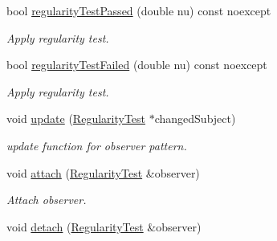 \begin{DoxyCompactItemize}
\item 
bool \hyperlink{classSpacy_1_1Mixin_1_1RegularityTest_a606383e629ebc0e84dc1cb6796aeeae1}{regularity\+Test\+Passed} (double nu) const noexcept
\begin{DoxyCompactList}\small\item\em Apply regularity test. \end{DoxyCompactList}\item 
bool \hyperlink{classSpacy_1_1Mixin_1_1RegularityTest_ac16e5fb18f3b591da58e32b821345f3d}{regularity\+Test\+Failed} (double nu) const noexcept
\begin{DoxyCompactList}\small\item\em Apply regularity test. \end{DoxyCompactList}\item 
void \hyperlink{classSpacy_1_1Mixin_1_1RegularityTest_a1a6191e20f84025cec8b10ec63ab94ac}{update} (\hyperlink{classSpacy_1_1Mixin_1_1RegularityTest_a89c4ffe9b8891c1f81d57e84141a2ef6}{Regularity\+Test} $\ast$changed\+Subject)\hypertarget{classSpacy_1_1Mixin_1_1RegularityTest_a1a6191e20f84025cec8b10ec63ab94ac}{}\label{classSpacy_1_1Mixin_1_1RegularityTest_a1a6191e20f84025cec8b10ec63ab94ac}

\begin{DoxyCompactList}\small\item\em update function for observer pattern. \end{DoxyCompactList}\item 
void \hyperlink{classSpacy_1_1Mixin_1_1MixinConnection_abb5520ee6b22dd993d78f142939a1ed4}{attach} (\hyperlink{classSpacy_1_1Mixin_1_1RegularityTest_a89c4ffe9b8891c1f81d57e84141a2ef6}{Regularity\+Test} \&observer)\hypertarget{classSpacy_1_1Mixin_1_1MixinConnection_abb5520ee6b22dd993d78f142939a1ed4}{}\label{classSpacy_1_1Mixin_1_1MixinConnection_abb5520ee6b22dd993d78f142939a1ed4}

\begin{DoxyCompactList}\small\item\em Attach observer. \end{DoxyCompactList}\item 
void \hyperlink{classSpacy_1_1Mixin_1_1MixinConnection_adda739590c487679c26f60e50aedb73f}{detach} (\hyperlink{classSpacy_1_1Mixin_1_1RegularityTest_a89c4ffe9b8891c1f81d57e84141a2ef6}{Regularity\+Test} \&observer)\hypertarget{classSpacy_1_1Mixin_1_1MixinConnection_adda739590c487679c26f60e50aedb73f}{}\label{classSpacy_1_1Mixin_1_1MixinConnection_adda739590c487679c26f60e50aedb73f}


\end{DoxyCompactItemize}

